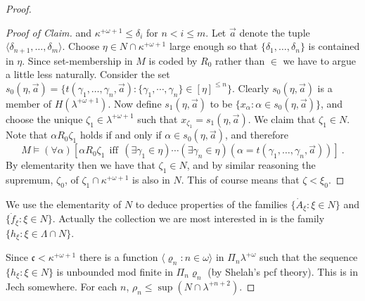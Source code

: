 \documentclass{amsart}
\theoremstyle{plain}
\theoremstyle{definition}
\theoremstyle{remark}
\theoremstyle{plain}
\theoremstyle{definition}
\theoremstyle{remark}
\begin{document}
\begin{proof}
\begin{proof}[Proof of Claim]
              and $\kappa^{+\omega+1}\leq \delta_i$ for $n<i\leq m$.
              Let $\vec a $ denote
              the tuple $\langle \delta_{n+1},\ldots, \delta_m\rangle$.
            Choose $\eta\in N\cap \kappa^{+\omega+1}$ large enough so that
           $ \{  \delta_1, \ldots, \delta_n\}$ is contained in  $\eta$. Since set-membership
           in $M$ is coded by $R_0$ rather than $\in$ we have to argue a little
           less naturally.
           Consider the set
             $s_0(\eta,\vec a) = \{ t(\gamma_1,\ldots, \gamma_n,\vec a) :
          \{\gamma_1,\cdots,\gamma_n\} \in [\eta]^{\leq n}\}$. Clearly
           $s_0(\eta,\vec a)$ is a member of $H(\lambda^{+\omega+1})$.
           Now define $s_1(\eta,\vec a) $ to be
           $\{ x_\alpha : \alpha\in s_0(\eta, \vec a)\}$,
           and choose the
           unique $\zeta_1\in \lambda^{+\omega+1}$ such
           that $x_{\zeta_1} = s_1(\eta,\vec a)$. We claim that $\zeta_1\in N$.
           Note that $\alpha R_0\zeta_1$ holds if and only if
            $ \alpha \in s_0(\eta,\vec a)$, and therefore
           $$M\models (\forall \alpha)\left[\alpha R_0 \zeta_1 ~~\mbox{iff}~~
           (\exists   \gamma_1\in \eta)\cdots(\exists \gamma_n\in\eta)(\alpha=
           t(\gamma_1,\ldots, \gamma_n,\vec a))\right]~.$$
           By elementarity then we have that $\zeta_1\in N$,
           and by similar reasoning the supremum, $\zeta_0$,
          of $\zeta_1\cap \kappa^{+\omega+1}$ is also in $N$.
             This of course means that $\zeta < \xi_0$.
          \end{proof}

          We use the elementarity of
           $N$  to deduce properties of the families
           $\{ \dot A_\xi : \xi\in N\}$ and $\{ \dot f_\xi : \xi \in
           N\}$.  Actually the collection we are most interested in
           is the family $\{ h_\xi : \xi\in \Lambda\cap N\}$.

           Since  $\mathfrak c < \kappa^{+\omega+1}$ there
            is a function $\langle \varrho_n : n\in \omega\rangle$
            in $\Pi_n \lambda^{+\omega}   $ such that the sequence
             $\{ h_\xi : \xi \in N\}$ is unbounded mod finite
             in $\Pi_n \varrho_n$ (by Shelah's pcf theory).
             This is in Jech somewhere.
             For each $n$, $\rho_n \leq \sup(N\cap \lambda^{+n+2})$.


\end{proof}
\end{document}
